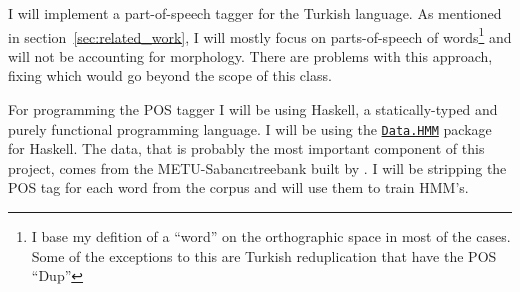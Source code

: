 \documentclass{article}
\newcommand{\hmmURL}{https://hackage.haskell.org/package/hmm-0.2.1.1/docs/Data-HMM.html}
\begin{document}
I will implement a part-of-speech tagger for the Turkish language. As
mentioned in section~\ref{sec:related_work}, I will mostly focus on parts-of-speech
of words\footnote{I base my defition of a ``word'' on the orthographic space in
  most of the cases. Some of the exceptions to this are Turkish reduplication
  that have the POS ``Dup''} and will not be accounting for morphology. There are problems with this
approach, fixing which would go beyond the scope of this class.

For programming the POS tagger I will be using Haskell, a statically-typed and purely
functional programming language. I will be using the
\href{\hmmURL}{\texttt{Data.HMM}} package for
Haskell. The data, that is probably the most important component of this
project, comes from the METU-Sabanc\i treebank built by
\citet{oflazer2003building}. I will be stripping the POS tag for each word from
the corpus and will use them to train HMM's.



\end{document}
